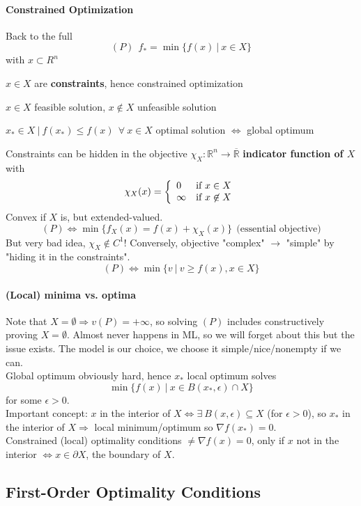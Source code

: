 \documentclass[10pt]{report}
\begin{document}
\paragraph{Constrained Optimization} Back to the full $$(P)\:\:f_* = \min\{f(x)\:|\:x\in X\}$$ with $x\subset R^n$\begin{list}{}{}
	\item $x\in X$ are \textbf{constraints}, hence constrained optimization
	\item $x\in X$ feasible solution, $x\not\in X$ unfeasible solution
	\item $x_*\in X\:|\:f(x_*)\leq f(x)\:\:\forall\:x\in X$ optimal solution $\Leftrightarrow$ global optimum
\end{list}
Constraints can be hidden in the objective $\chi_X : \mathbb{R}^n\rightarrow \overline{\mathbb{R}}$ \textbf{indicator function of $X$} with $$\chi_X(x)=\left\{\begin{array}{l l}
0&\text{if }x\in X\\
\infty&\text{if }x\not\in X
\end{array}\right.$$ Convex if $X$ is, but extended-valued.
$$(P)\Leftrightarrow \min\{f_X(x)=f(x)+\chi_X(x)\}\:\:\text{(essential objective)}$$ But very bad idea, $\chi_X\not\in C^1$! Conversely, objective "complex" $\rightarrow$ "simple" by "hiding it in the constraints".
$$(P)\Leftrightarrow\min\{v\:|\:v\geq f(x), x\in X\}$$
\paragraph{(Local) minima vs. optima} Note that $X=\emptyset\Rightarrow v(P) = +\infty$, so solving $(P)$ includes constructively proving $X=\emptyset$. Almost never happens in ML, so we will forget about this but the issue exists. The model is our choice, we choose it simple/nice/nonempty if we can.\\
Global optimum obviously hard, hence $x_*$ local optimum solves $$\min\{f(x)\:|\:x\in B(x_*,\epsilon)\cap X\}$$ for some $\epsilon>0$.\\
Important concept: $x$ in the interior of $X\Leftrightarrow\exists\:B(x,\epsilon)\subseteq X$ (for $\epsilon>0$), so $x_*$ in the interior of $X\Rightarrow$ local minimum/optimum so $\nabla f(x_*)=0$.\\
Constrained (local) optimality conditions $\neq\nabla f(x)=0$, only if $x$ not in the interior $\Leftrightarrow x\in \partial X$, the boundary of $X$.
\subsection{First-Order Optimality Conditions}
\end{document}
